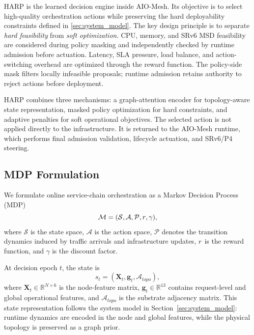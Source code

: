 \documentclass[final,5p]{elsarticle}
\newcommand{\rev}[1]{\textcolor{revisiongreen}{#1}}
\let\newrev\rev
\begin{document}
HARP is the learned decision engine inside AIO-Mesh. Its objective is to select high-quality orchestration actions while preserving the hard deployability constraints defined in \autoref{sec:system_model}. The key design principle is to separate \emph{hard feasibility} from \emph{soft optimization}. CPU, memory, and SRv6 MSD feasibility are \rev{considered during policy masking and independently checked by runtime admission} before actuation. Latency, SLA pressure, load balance, and \rev{action-switching overhead} are optimized through the reward function. \rev{The policy-side mask filters locally infeasible proposals; runtime admission retains authority to reject actions before deployment.}

HARP combines three mechanisms: a graph-attention encoder for topology-aware state representation, masked policy optimization for hard constraints, and adaptive penalties for soft operational objectives. The selected action is not applied directly to the infrastructure. It is returned to the AIO-Mesh runtime, which performs final admission validation, lifecycle actuation, and SRv6/P4 steering.

\subsection{MDP Formulation}
\label{subsec:harp_mdp}


We formulate online service-chain orchestration as a \newrev{Markov Decision Process (MDP)}
\begin{equation}
    \mathcal{M}=(\mathcal{S},\mathcal{A},\mathcal{P},\newrev{r},\gamma),
\end{equation}
where \(\mathcal{S}\) is the state space, \(\mathcal{A}\) is the action space, \(\mathcal{P}\) denotes the transition dynamics induced by traffic arrivals and infrastructure updates, \(\newrev{r}\) is the reward function, and \(\gamma\) is the discount factor.

At decision epoch \(t\), the state is
\begin{equation}
    s_t=(\mathbf{X}_t,\mathbf{g}_t,\mathcal{A}_{topo}),
\end{equation}
where \(\mathbf{X}_t\in\mathbb{R}^{N\times 6}\) is the node-feature matrix, \(\mathbf{g}_t\in\mathbb{R}^{13}\) contains request-level and global operational features, and \(\mathcal{A}_{topo}\) is the substrate adjacency matrix. This state representation follows the system model in Section~\ref{sec:system_model}: runtime dynamics are encoded in the node and global features, while the physical topology is preserved as a graph prior.
\end{document}
